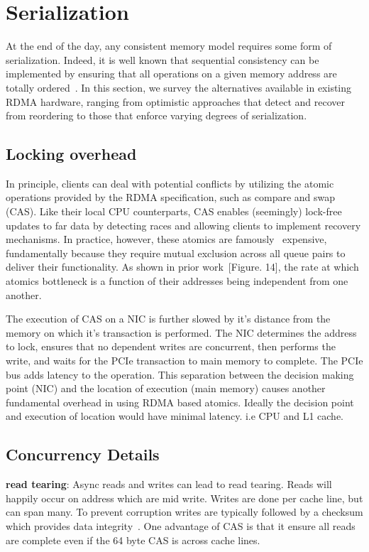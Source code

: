 \section{Serialization}

At the end of the day, any consistent memory model requires some form
of serialization.  Indeed, it is well known that sequential
consistency can be implemented by ensuring that all operations on a
given memory address are totally ordered~\cite{ivy}.  In this section,
we survey the alternatives available in existing RDMA hardware, ranging from optimistic approaches that detect and recover from reordering to those that enforce varying degrees of serialization.

\subsection{Locking overhead}

In principle, clients can deal with potential conflicts by utilizing the atomic
operations provided by the RDMA specification, such as compare and swap (CAS).
Like their local CPU counterparts, CAS enables (seemingly) lock-free updates to
far data by detecting races and allowing clients to implement recovery
mechanisms. In practice, however, these atomics are
famously~\cite{design-guidelines,clover} expensive, fundamentally because they
require mutual exclusion across all queue pairs to deliver their functionality.
As shown in prior work~\cite{design-guidelines}[Figure. 14], the rate at which
atomics bottleneck is a function of their addresses being independent from one
another.

The execution of CAS on a NIC is further slowed by it's distance from the memory
on which it's transaction is performed. The NIC determines the address to lock,
ensures that no dependent writes are concurrent, then performs the write, and
waits for the PCIe transaction to main memory to complete. The PCIe bus adds
latency to the operation. This separation between the decision making point
(NIC) and the location of execution (main memory) causes another fundamental
overhead in using RDMA based atomics. Ideally the decision point and execution
of location would have minimal latency. i.e CPU and L1 cache.

\subsection{Concurrency Details}
\textbf{read tearing}: Async reads and writes can lead to read tearing. Reads
will happily occur on address which are mid write. Writes are done per cache
line, but can span many. To prevent corruption writes are typically followed by
a checksum which provides data integrity~\cite{pilaf,clover}. One advantage of CAS is
that it ensure all reads are complete even if the 64 byte CAS is across cache
lines.

